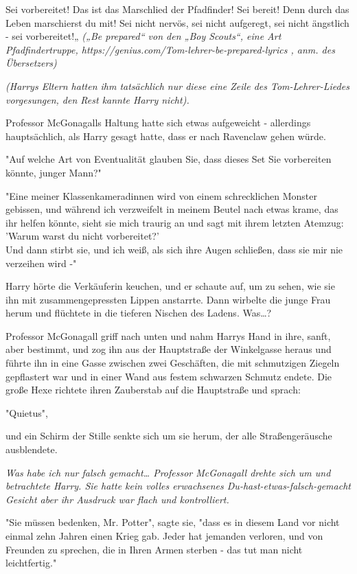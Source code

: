 {Sei vorbereitet! Das ist das Marschlied der Pfadfinder! Sei bereit! Denn durch das Leben marschierst du mit! Sei nicht nervös, sei nicht aufgeregt, sei nicht ängstlich - sei vorbereitet!„ \emph{(„Be prepared“ von den „Boy Scouts“, eine Art Pfadfindertruppe, \emph{https://genius.com/Tom-lehrer-be-prepared-lyrics} \emph{, anm. des Übersetzers)}}

\emph{(Harrys Eltern hatten ihm tatsächlich nur diese eine Zeile des Tom-Lehrer-Liedes vorgesungen, den Rest kannte Harry nicht).}

Professor McGonagalls Haltung hatte sich etwas aufgeweicht - allerdings hauptsächlich, als Harry gesagt hatte, dass er nach Ravenclaw gehen würde.

"Auf welche Art von Eventualität glauben Sie, dass dieses Set Sie vorbereiten könnte, junger Mann?"

"Eine meiner Klassenkameradinnen wird von einem schrecklichen Monster gebissen, und während ich verzweifelt in meinem Beutel nach etwas krame, das ihr helfen könnte, sieht sie mich traurig an und sagt mit ihrem letzten Atemzug:\\ 'Warum warst du nicht vorbereitet?'\\ Und dann stirbt sie, und ich weiß, als sich ihre Augen schließen, dass sie mir nie verzeihen wird -"

Harry hörte die Verkäuferin keuchen, und er schaute auf, um zu sehen, wie sie ihn mit zusammengepressten Lippen anstarrte. Dann wirbelte die junge Frau herum und flüchtete in die tieferen Nischen des Ladens. Was…?

Professor McGonagall griff nach unten und nahm Harrys Hand in ihre, sanft, aber bestimmt, und zog ihn aus der Hauptstraße der Winkelgasse heraus und führte ihn in eine Gasse zwischen zwei Geschäften, die mit schmutzigen Ziegeln gepflastert war und in einer Wand aus festem schwarzen Schmutz endete. Die große Hexe richtete ihren Zauberstab auf die Hauptstraße und sprach:

"Quietus",

und ein Schirm der Stille senkte sich um sie herum, der alle Straßengeräusche ausblendete.

\emph{Was habe ich nur falsch gemacht… Professor McGonagall drehte sich um und betrachtete Harry. Sie hatte kein volles erwachsenes \emph{Du-hast-etwas-falsch-gemacht} Gesicht aber ihr Ausdruck war flach und kontrolliert.}

"Sie müssen bedenken, Mr. Potter", sagte sie, "dass es in diesem Land vor nicht einmal zehn Jahren einen Krieg gab. Jeder hat jemanden verloren, und von Freunden zu sprechen, die in Ihren Armen sterben - das tut man nicht leichtfertig."

}
